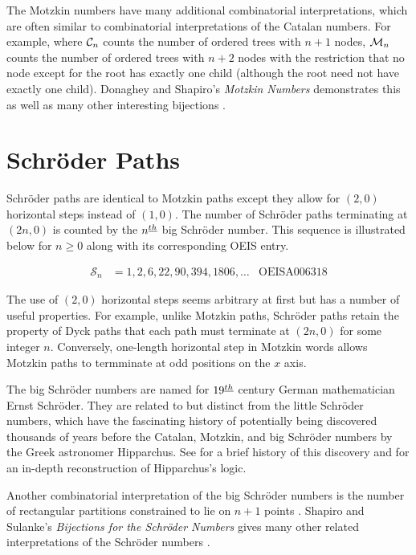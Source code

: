 The Motzkin numbers have many additional combinatorial interpretations, which are often similar to combinatorial interpretations of the Catalan numbers.  For example, where $\mathcal{C}_n$ counts the number of ordered trees with $n+1$ nodes, $\mathcal{M}_n$ counts the number of ordered trees with $n+2$ nodes with the restriction that no node except for the root has exactly one child (although the root need not have exactly one child). Donaghey and Shapiro's \emph{Motzkin Numbers} demonstrates this as well as many other interesting bijections \cite{donaghey1977motzkin}.

\section{Schröder Paths}\label{sec:schroder}

Schröder paths are identical to Motzkin paths except they allow for $(2,0)$ horizontal steps instead of $(1,0)$.  The number of Schröder paths terminating at $(2n,0)$ is counted by the $n^{\underline{th}}$ big Schröder number.  This sequence is illustrated below for $n \ge 0$ along with its corresponding OEIS entry.

\begin{align}
\mathcal{S}_n &= 1, 2, 6, 22, 90, 394, 1806, \ldots & \text{OEIS} \text{A}006318
\end{align}

The use of $(2,0)$ horizontal steps seems arbitrary at first but has a number of useful properties.  For example, unlike Motzkin paths, Schröder paths retain the property of Dyck paths that each path must terminate at $(2n,0)$ for some integer $n$.  Conversely, one-length horizontal step in Motzkin words allows Motzkin paths to termminate at odd positions on the $x$ axis.  

The big Schröder numbers are named for $19^{\underline{th}}$ century German mathematician Ernst Schröder.  They are related to but distinct from the little Schröder numbers, which have the fascinating history of potentially being discovered thousands of years before the Catalan, Motzkin, and big Schröder numbers by the Greek astronomer Hipparchus.  See \cite{stanley1997hipparchus} for a brief history of this discovery and \cite{bobzien2011combinatorics} for an in-depth reconstruction of Hipparchus's logic. 

Another combinatorial interpretation of the big Schröder numbers is the number of rectangular partitions constrained to lie on $n+1$ points \cite{ackerman2004number}.  Shapiro and Sulanke's \emph{Bijections for the Schröder Numbers} gives many other related interpretations of the Schröder numbers \cite{shapiro2000bijections}.

